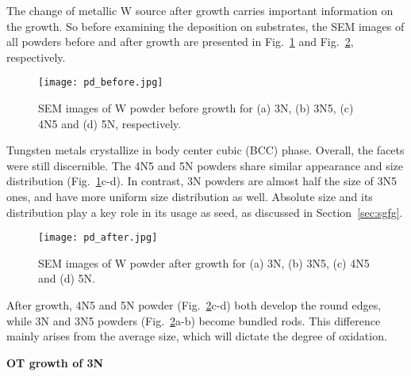 The change of metallic W source after growth carries important information on the growth. So before examining the deposition on substrates, the SEM images of all powders before and after growth are presented in Fig.~\ref{fig:pdbefore} and Fig.~\ref{fig:pdafter}, respectively.
\begin{figure}[htb]
\centering
\texttt{[image: pd\_before.jpg]}
\caption[SEM images of W powder before growth]{SEM images of W powder before growth for (a) 3N, (b) 3N5, (c) 4N5 and (d) 5N, respectively.}
\label{fig:pdbefore}
\end{figure}
Tungsten metals crystallize in body center cubic (BCC) phase. Overall, the facets were still discernible. The 4N5 and 5N powders share similar appearance and size distribution (Fig.~\ref{fig:pdbefore}c-d). In contrast, 3N powders are almost half the size of 3N5 ones, and have more uniform size distribution as well. Absolute size and its distribution play a key role in its usage as seed, as discussed in Section~\ref{sec:sgfg}.
\begin{figure}[htb]
\centering
\texttt{[image: pd\_after.jpg]}
\caption[SEM images of W powder after growth]{SEM images of W powder after growth for (a) 3N, (b) 3N5, (c) 4N5 and (d) 5N. }
\label{fig:pdafter}
\end{figure}
After growth, 4N5 and 5N powder (Fig.~\ref{fig:pdafter}c-d) both develop the round edges, while 3N and 3N5 powders (Fig.~\ref{fig:pdafter}a-b) become bundled rods. This difference mainly arises from the average size, which will dictate the degree of oxidation.

\textbf{OT growth of 3N}

